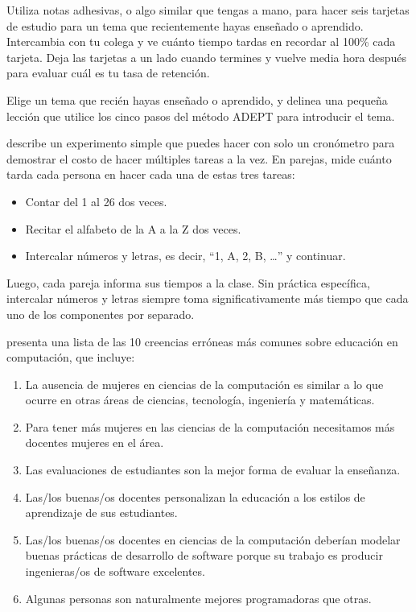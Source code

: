 
Utiliza notas adhesivas, o algo similar que tengas a mano,
para hacer seis tarjetas de estudio
para un tema que recientemente hayas enseñado o aprendido.
Intercambia con tu colega y ve cuánto tiempo tardas en recordar
al 100\% cada tarjeta.
Deja las tarjetas a un lado cuando termines
y vuelve media hora después para evaluar cuál es tu tasa de retención.


Elige un tema que recién hayas enseñado o aprendido,
y delinea una pequeña lección que utilice los cinco pasos del método ADEPT para introducir el tema.


describe un experimento simple que puedes hacer con solo un cronómetro
para demostrar el costo de hacer múltiples tareas a la vez.
En parejas,
mide cuánto tarda cada persona en hacer cada una de estas tres tareas:

\begin{itemize}
\item
  Contar del 1 al 26 dos veces.
\item
  Recitar el alfabeto de la A a la Z dos veces.
\item
  Intercalar números y letras,
  es decir, ``1, A, 2, B, {\ldots}''
  y continuar.
\end{itemize}

Luego, cada pareja informa sus tiempos a la clase.
Sin práctica específica,
intercalar números y letras siempre toma significativamente más tiempo que cada uno de los componentes por separado.


\cite{Guzd2015b} presenta una lista de las 10 creencias erróneas más comunes sobre educación en computación,
que incluye:

\begin{enumerate}
\item
  La ausencia de mujeres en ciencias de la computación es similar a lo que ocurre en otras áreas de ciencias, tecnología, ingeniería y matemáticas.
\item
  Para tener más mujeres en las ciencias de la computación necesitamos más docentes mujeres en el área.
\item
  Las evaluaciones de estudiantes son la mejor forma de evaluar la enseñanza.
\item
  Las/los buenas/os docentes personalizan la educación a los estilos de aprendizaje de sus estudiantes.
\item
  Las/los buenas/os docentes en ciencias de la computación deberían modelar buenas prácticas 
  de desarrollo de software porque su trabajo es producir ingenieras/os de software excelentes.
\item
  Algunas personas son naturalmente mejores programadoras que otras.
\end{enumerate}

